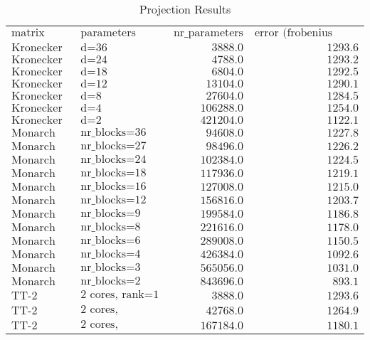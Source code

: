 \centering
\tiny
\begin{longtable}{llrr}
\caption{Projection Results} \label{tab:projection_table} \\
$\text{matrix type}$ & $\text{parameters}$ & $\text{nr\_parameters}$ & $\text{error (frobenius norm)}$\\
$\text{Kronecker}$ & $\text{d=36}$ & $3888.0$ & $1293.6$\\
$\text{Kronecker}$ & $\text{d=24}$ & $4788.0$ & $1293.2$\\
$\text{Kronecker}$ & $\text{d=18}$ & $6804.0$ & $1292.5$\\
$\text{Kronecker}$ & $\text{d=12}$ & $13104.0$ & $1290.1$\\
$\text{Kronecker}$ & $\text{d=8}$ & $27604.0$ & $1284.5$\\
$\text{Kronecker}$ & $\text{d=4}$ & $106288.0$ & $1254.0$\\
$\text{Kronecker}$ & $\text{d=2}$ & $421204.0$ & $1122.1$\\
$\text{Monarch}$ & $\text{nr\_blocks=36}$ & $94608.0$ & $1227.8$\\
$\text{Monarch}$ & $\text{nr\_blocks=27}$ & $98496.0$ & $1226.2$\\
$\text{Monarch}$ & $\text{nr\_blocks=24}$ & $102384.0$ & $1224.5$\\
$\text{Monarch}$ & $\text{nr\_blocks=18}$ & $117936.0$ & $1219.1$\\
$\text{Monarch}$ & $\text{nr\_blocks=16}$ & $127008.0$ & $1215.0$\\
$\text{Monarch}$ & $\text{nr\_blocks=12}$ & $156816.0$ & $1203.7$\\
$\text{Monarch}$ & $\text{nr\_blocks=9}$ & $199584.0$ & $1186.8$\\
$\text{Monarch}$ & $\text{nr\_blocks=8}$ & $221616.0$ & $1178.0$\\
$\text{Monarch}$ & $\text{nr\_blocks=6}$ & $289008.0$ & $1150.5$\\
$\text{Monarch}$ & $\text{nr\_blocks=4}$ & $426384.0$ & $1092.6$\\
$\text{Monarch}$ & $\text{nr\_blocks=3}$ & $565056.0$ & $1031.0$\\
$\text{Monarch}$ & $\text{nr\_blocks=2}$ & $843696.0$ & $893.1$\\
$\text{TT-2}$ & $\text{2 cores, rank=1}$ & $3888.0$ & $1293.6$\\
$\text{TT-2}$ & $\text{2 cores, rank=16}$ & $42768.0$ & $1264.9$\\
$\text{TT-2}$ & $\text{2 cores, rank=64}$ & $167184.0$ & $1180.1$\\

\end{longtable}
